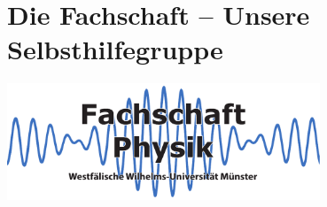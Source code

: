 \section{Die Fachschaft -- Unsere Selbsthilfegruppe}
\begin{center}
	\vspace{-0.5cm}
	\includegraphics[width=0.7\textwidth]{res/fsphys_logo.pdf}
	\vspace{-0.5cm}
\end{center}
